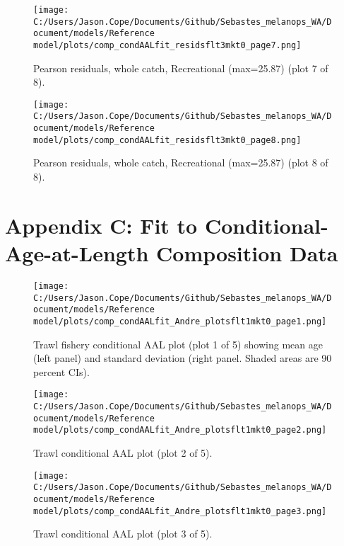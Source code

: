 \documentclass[11pt,
  english,
  letterpaper,
]{article}
\begin{document}
\begin{figure}
\centering
\texttt{[image: C:/Users/Jason.Cope/Documents/Github/Sebastes\_melanops\_WA/Document/models/Reference model/plots/comp\_condAALfit\_residsflt3mkt0\_page7.png]}
\caption{Pearson residuals, whole catch, Recreational (max=25.87) (plot 7 of 8).\label{fig:comp_condAALfit_residsflt3mkt0_page7}}
\end{figure}

\begin{figure}
\centering
\texttt{[image: C:/Users/Jason.Cope/Documents/Github/Sebastes\_melanops\_WA/Document/models/Reference model/plots/comp\_condAALfit\_residsflt3mkt0\_page8.png]}
\caption{Pearson residuals, whole catch, Recreational (max=25.87) (plot 8 of 8).\label{fig:comp_condAALfit_residsflt3mkt0_page8}}
\end{figure}

\clearpage

\hypertarget{app-c}{%
\section{Appendix C: Fit to Conditional-Age-at-Length Composition Data}\label{app-c}}

\begin{figure}
\centering
\texttt{[image: C:/Users/Jason.Cope/Documents/Github/Sebastes\_melanops\_WA/Document/models/Reference model/plots/comp\_condAALfit\_Andre\_plotsflt1mkt0\_page1.png]}
\caption{Trawl fishery conditional AAL plot (plot 1 of 5) showing mean age (left panel) and standard deviation (right panel. Shaded areas are 90 percent CIs).\label{fig:comp_condAALfit_Andre_plotsflt1mkt0_page1}}
\end{figure}

\begin{figure}
\centering
\texttt{[image: C:/Users/Jason.Cope/Documents/Github/Sebastes\_melanops\_WA/Document/models/Reference model/plots/comp\_condAALfit\_Andre\_plotsflt1mkt0\_page2.png]}
\caption{Trawl conditional AAL plot (plot 2 of 5).\label{fig:comp_condAALfit_Andre_plotsflt1mkt0_page2}}
\end{figure}

\begin{figure}
\centering
\texttt{[image: C:/Users/Jason.Cope/Documents/Github/Sebastes\_melanops\_WA/Document/models/Reference model/plots/comp\_condAALfit\_Andre\_plotsflt1mkt0\_page3.png]}
\caption{Trawl conditional AAL plot (plot 3 of 5).\label{fig:comp_condAALfit_Andre_plotsflt1mkt0_page3}}
\end{figure}
\end{document}
